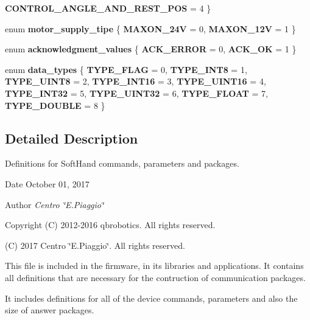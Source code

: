 \begin{DoxyCompactItemize}
\newline
\textbf{ C\+O\+N\+T\+R\+O\+L\+\_\+\+A\+N\+G\+L\+E\+\_\+\+A\+N\+D\+\_\+\+R\+E\+S\+T\+\_\+\+P\+OS} = 4
 \}
\item 
\mbox{\label{commands_8h_a17c218160a8b2c5f25db27616793d564}} 
enum {\bfseries motor\+\_\+supply\+\_\+tipe} \{ {\bfseries M\+A\+X\+O\+N\+\_\+24V} = 0, 
{\bfseries M\+A\+X\+O\+N\+\_\+12V} = 1
 \}
\item 
\mbox{\label{commands_8h_a0eae1c82d20671c5d0b9b82b10070f1b}} 
enum {\bfseries acknowledgment\+\_\+values} \{ {\bfseries A\+C\+K\+\_\+\+E\+R\+R\+OR} = 0, 
{\bfseries A\+C\+K\+\_\+\+OK} = 1
 \}
\item 
\mbox{\label{commands_8h_aee7544e5fa6e2843ecdc3609602e56aa}} 
enum {\bfseries data\+\_\+types} \{ \newline
{\bfseries T\+Y\+P\+E\+\_\+\+F\+L\+AG} = 0, 
{\bfseries T\+Y\+P\+E\+\_\+\+I\+N\+T8} = 1, 
{\bfseries T\+Y\+P\+E\+\_\+\+U\+I\+N\+T8} = 2, 
{\bfseries T\+Y\+P\+E\+\_\+\+I\+N\+T16} = 3, 
\newline
{\bfseries T\+Y\+P\+E\+\_\+\+U\+I\+N\+T16} = 4, 
{\bfseries T\+Y\+P\+E\+\_\+\+I\+N\+T32} = 5, 
{\bfseries T\+Y\+P\+E\+\_\+\+U\+I\+N\+T32} = 6, 
{\bfseries T\+Y\+P\+E\+\_\+\+F\+L\+O\+AT} = 7, 
\newline
{\bfseries T\+Y\+P\+E\+\_\+\+D\+O\+U\+B\+LE} = 8
 \}
\end{DoxyCompactItemize}


\subsection{Detailed Description}
Definitions for Soft\+Hand commands, parameters and packages. 

\begin{DoxyDate}{Date}
October 01, 2017 
\end{DoxyDate}
\begin{DoxyAuthor}{Author}
{\itshape Centro \char`\"{}\+E.\+Piaggio\char`\"{}} 
\end{DoxyAuthor}
\begin{DoxyCopyright}{Copyright}
(C) 2012-\/2016 qbrobotics. All rights reserved. 

(C) 2017 Centro \char`\"{}\+E.\+Piaggio\char`\"{}. All rights reserved.
\end{DoxyCopyright}
This file is included in the firmware, in its libraries and applications. It contains all definitions that are necessary for the contruction of communication packages.

It includes definitions for all of the device commands, parameters and also the size of answer packages. 

